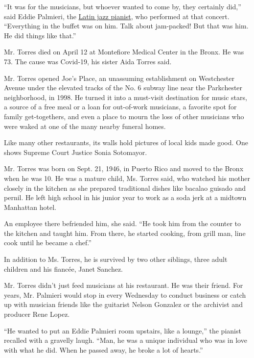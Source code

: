 ``It was for the musicians, but whoever wanted to come by, they
certainly did,'' said Eddie Palmieri, the
\href{https://www.palmierimusic.com/}{Latin jazz pianist}, who performed
at that concert. ``Everything in the buffet was on him. Talk about
jam-packed! But that was him. He did things like that.''

Mr. Torres died on April 12 at Montefiore Medical Center in the Bronx.
He was 73. The cause was Covid-19, his sister Aida Torres said.

Mr. Torres opened Joe's Place, an unassuming establishment on
Westchester Avenue under the elevated tracks of the No. 6 subway line
near the Parkchester neighborhood, in 1998. He turned it into a
must-visit destination for music stars, a source of a free meal or a
loan for out-of-work musicians, a favorite spot for family
get-togethers, and even a place to mourn the loss of other musicians who
were waked at one of the many nearby funeral homes.

Like many other restaurants, its walls hold pictures of local kids made
good. One shows Supreme Court Justice Sonia Sotomayor.

Mr. Torres was born on Sept. 21, 1946, in Puerto Rico and moved to the
Bronx when he was 10. He was a mature child, Ms. Torres said, who
watched his mother closely in the kitchen as she prepared traditional
dishes like bacalao guisado and pernil. He left high school in his
junior year to work as a soda jerk at a midtown Manhattan hotel.

An employee there befriended him, she said. ``He took him from the
counter to the kitchen and taught him. From there, he started cooking,
from grill man, line cook until he became a chef.''

In addition to Ms. Torres, he is survived by two other siblings, three
adult children and his fiancée, Janet Sanchez.

Mr. Torres didn't just feed musicians at his restaurant. He was their
friend. For years, Mr. Palmieri would stop in every Wednesday to conduct
business or catch up with musician friends like the guitarist Nelson
Gonzalez or the archivist and producer Rene Lopez.

``He wanted to put an Eddie Palmieri room upstairs, like a lounge,'' the
pianist recalled with a gravelly laugh. ``Man, he was a unique
individual who was in love with what he did. When he passed away, he
broke a lot of hearts.''

\href{https://www.nytimes.com/interactive/2020/obituaries/people-died-coronavirus-obituaries.html?action=click\&pgtype=Article\&state=default\&region=BELOW_MAIN_CONTENT\&context=covid_obits_promo}{}

